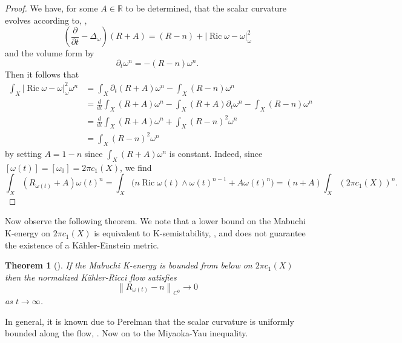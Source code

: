 \documentclass[12pt]{article}
\newtheorem{theorem}{Theorem}[section]
\numberwithin{equation}{section}
\newcommand{\R}{\mathbb{R}}
\renewcommand{\d}{\partial}
\DeclareMathOperator{\Ric}{Ric}
\newcommand{\parabolic}[1]{\left(\frac{\d}{\d t} - \Delta_{#1}\right)}
\newcommand{\norm}[1]{\left\|#1\right\|}
\begin{document}
\begin{proof}
We have, for some $A \in \R$ to be determined, that the scalar curvature evolves according to, \cite{TZ16},
\begin{equation*}
    \parabolic{\omega} (R + A) = (R - n) + |\Ric \omega - \omega|_{\omega}^2
\end{equation*}
and the volume form by
\begin{equation*}
    \d_t \omega^n = -(R-n)\omega^n.
\end{equation*}
Then it follows that
\begin{align*}
    \int_X |\Ric \omega - \omega|^2_{\omega} \omega^n &= \int_X \d_t(R +A) \omega^n - \int_X (R-n )\omega^n\\
    &= \frac{d}{dt} \int_X (R + A) \omega^n - \int_X (R + A) \d_t\omega^n - \int_X (R- n) \omega^n\\
    &= \frac{d}{dt} \int_X (R+A) \omega^n + \int_X (R-n)^2 \omega^n\\
    &= \int_X (R-n)^2 \omega^n
\end{align*}
by setting $A = 1-n$ since $\int_X (R +A) \omega^n$ is constant. Indeed, since $[\omega(t)] = [\omega_0] = 2 \pi c_1(X)$, we find
\begin{equation*}
    \int_X (R_{\omega(t)} + A) \omega(t)^n = \int_X \Big(n \Ric \omega(t) \wedge \omega(t)^{n-1} + A \omega(t)^n\Big) =  (n + A) \int_X (2 \pi c_1(X))^n.
\end{equation*}
\end{proof}

\noindent Now observe the following theorem. We note that a lower bound on the Mabuchi K-energy on $2 \pi c_1(X)$ is equivalent to K-semistability, \cite{L17}, and does not guarantee the existence of a K\"ahler-Einstein metric.

\begin{theorem}[\cite{PSSW09}]
If the Mabuchi K-energy is bounded from below on $2 \pi c_1(X)$ then the normalized K\"ahler-Ricci flow satisfies
\begin{equation*}
    \norm{R_{\omega(t)} - n}_{C^0} \to 0
\end{equation*}
as $t \to \infty$.
\end{theorem}

\noindent In general, it is known due to Perelman that the scalar curvature is uniformly bounded along the flow, \cite{SesT08}. Now on to the Miyaoka-Yau inequality. 
\end{document}
